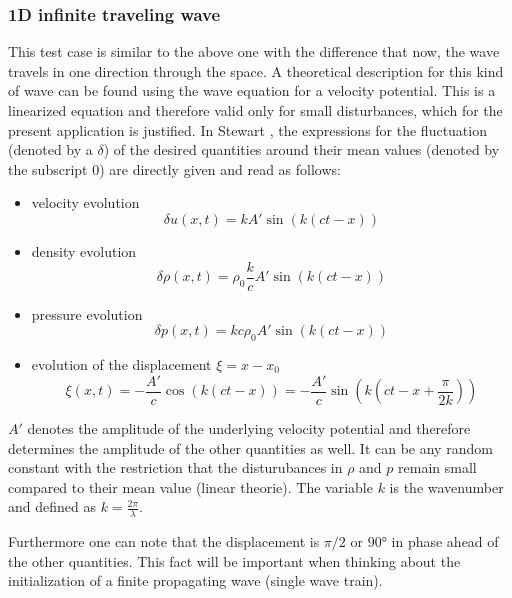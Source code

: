 \documentclass{report}
\begin{document}
\subsubsection{1D infinite traveling wave}
This test case is similar to the above one with the difference that now, the wave travels in one direction through the space. A theoretical description for this kind of wave can be found using the wave equation for a velocity potential. This is a linearized equation and therefore valid only for small disturbances, which for the present application is justified.
In Stewart \cite{Stewart1930}, the expressions for the fluctuation (denoted by a $\delta$) of the desired quantities around their mean values (denoted by the subscript $0$) are directly given and read as follows:
\begin{itemize}
\item velocity evolution 
\begin{equation}
\label{eq:1DWaveDetla_u}
 \delta u(x,t)=k A\prime \sin(k(ct-x))
\end{equation}
\item density evolution 
\begin{equation}
 \delta \rho(x,t)=\rho_0\frac{k}{c} A\prime  \sin(k(ct-x))
\end{equation}
\item pressure evolution 
\begin{equation}
 \delta p(x,t)=k c \rho_0 A\prime  \sin(k(ct-x))
\end{equation}
\item evolution of the displacement $\xi=x-x_0$
\begin{equation}
\label{eq:1DWaveDisplacement}
 \xi(x,t)=-\frac{A\prime }{c} \cos(k(ct-x))=-\frac{A\prime }{c} \sin(k(ct-x+\frac{\pi}{2k}))
\end{equation}

\end{itemize}

$A\prime $ denotes the amplitude of the underlying velocity potential and therefore determines the amplitude of the other quantities as well. It can be any random constant with the restriction that the disturubances in $\rho$ and $p$ remain small compared to their mean value (linear theorie). The variable $k$ is the  wavenumber and defined as $k=\frac{2\pi}{\lambda}$.

Furthermore one can note that the displacement is $\pi/2$ or $90°$ in phase ahead of the other quantities. This fact will be important when thinking about the initialization of a finite propagating wave (single wave train). 
\end{document}
